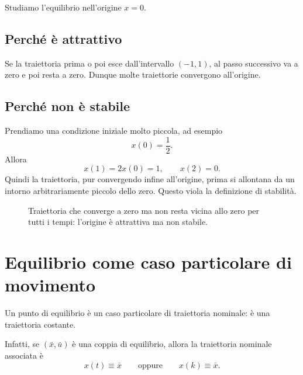 Studiamo l'equilibrio nell'origine \(x=0\).

\subsection*{Perché è attrattivo}
Se la traiettoria prima o poi esce dall'intervallo \((-1,1)\), al passo successivo va a zero e poi resta a zero. Dunque molte traiettorie convergono all'origine.

\subsection*{Perché non è stabile}
Prendiamo una condizione iniziale molto piccola, ad esempio
\[
x(0)=\frac{1}{2}.
\]
Allora
\[
x(1)=2x(0)=1,
\qquad
x(2)=0.
\]
Quindi la traiettoria, pur convergendo infine all'origine, prima si allontana da un intorno arbitrariamente piccolo dello zero. Questo viola la definizione di stabilità.

\begin{figure}[h!]
\centering
{}
\caption{Traiettoria che converge a zero ma non resta vicina allo zero per tutti i tempi: l'origine è attrattiva ma non stabile.}
\end{figure}

\bigskip

\section{Equilibrio come caso particolare di movimento}

Un punto di equilibrio è un caso particolare di traiettoria nominale: è una traiettoria costante.

Infatti, se \((\bar x,\bar u)\) è una coppia di equilibrio, allora la traiettoria nominale associata è
\[
x(t)\equiv \bar x
\qquad \text{oppure} \qquad
x(k)\equiv \bar x.
\]

